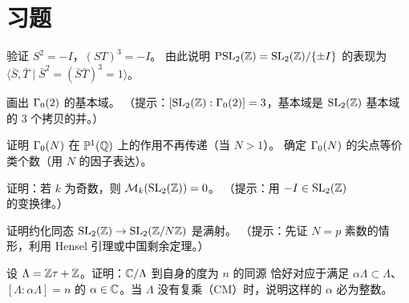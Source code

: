 \section{习题}
\label{sec:ch1-exercises}

\begin{exercise}
\label{ex:ch1-sl2z-1}
验证 $S^2 = -I$，$(ST)^3 = -I$。
由此说明 $\mathrm{PSL}_2(\mathbb{Z}) = \mathrm{SL}_2(\mathbb{Z})/\{\pm I\}$ 的表现为
$\langle \bar{S}, \bar{T} \mid \bar{S}^2 = (\bar{S}\bar{T})^3 = 1 \rangle$。
\end{exercise}

\begin{exercise}
\label{ex:ch1-fund-domain}
画出 $\Gamma_0(2)$ 的基本域。
（提示：$[\mathrm{SL}_2(\mathbb{Z}) : \Gamma_0(2)] = 3$，基本域是 $\mathrm{SL}_2(\mathbb{Z})$ 基本域的
$3$ 个拷贝的并。）
\end{exercise}

\begin{exercise}
\label{ex:ch1-cusps-gamma0}
证明 $\Gamma_0(N)$ 在 $\mathbb{P}^1(\mathbb{Q})$ 上的作用不再传递（当 $N > 1$）。
确定 $\Gamma_0(N)$ 的尖点等价类个数（用 $N$ 的因子表达）。
\end{exercise}

\begin{exercise}
\label{ex:ch1-weight-k}
证明：若 $k$ 为奇数，则 $\mathcal{M}_k(\mathrm{SL}_2(\mathbb{Z})) = 0$。
（提示：用 $-I \in \mathrm{SL}_2(\mathbb{Z})$ 的变换律。）
\end{exercise}

\begin{exercise}
\label{ex:ch1-surjection}
证明约化同态 $\mathrm{SL}_2(\mathbb{Z}) \to \mathrm{SL}_2(\mathbb{Z}/N\mathbb{Z})$ 是满射。
（提示：先证 $N = p$ 素数的情形，利用 Hensel 引理或中国剩余定理。）
\end{exercise}

\begin{exercise}
\label{ex:ch1-isogeny-degree}
设 $\Lambda = \mathbb{Z}\tau + \mathbb{Z}$。证明：$\mathbb{C}/\Lambda$ 到自身的度为 $n$ 的同源
恰好对应于满足 $\alpha\Lambda \subset \Lambda$、$[\Lambda : \alpha\Lambda] = n$
的 $\alpha \in \mathbb{C}$。当 $\Lambda$ 没有复乘（CM）时，说明这样的 $\alpha$ 必为整数。
\end{exercise}
